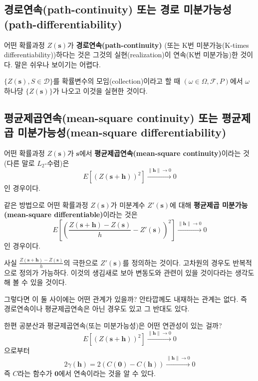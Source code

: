 \documentclass[b5paper,]{scrbook}
\theoremstyle{plain}
\theoremstyle{definition}
\numberwithin{equation}{section}
\begin{document}
\hypertarget{path-continuity---path-differentiability}{%
\subsection{경로연속(path-continuity) 또는 경로 미분가능성(path-differentiability)}\label{path-continuity---path-differentiability}}

어떤 확률과정 \(Z(\mathbf{s})\)가 \textbf{경로연속(path-continuity)} (또는 K번 미분가능(K-times differentiability))하다는 것은 그것의 실현(realization)이 연속(K번 미분가능)한 것이다. 말은 쉬우나 보이기는 어렵다.

\(\{ Z(\mathbf{s}) , S \in \mathcal{D}\}\)를 확률변수의 모임(collection)이라고 할 때 \((\omega \in \Omega, \mathcal{F}, P)\)에서 \(\omega\) 하나당 \(\{ Z(\mathbf{s})\}\)가 나오고 이것을 실현한 것이다.

\hypertarget{mean-square-continuity---mean-square-differentiability}{%
\subsection{평균제곱연속(mean-square continuity) 또는 평균제곱 미분가능성(mean-square differentiability)}\label{mean-square-continuity---mean-square-differentiability}}

어떤 확률과정 \(Z(\mathbf{s})\)가 \(\mathbf{s}\)에서 \textbf{평균제곱연속(mean-square continuity)}이라는 것(다른 말로 \(L_{2}\)-수렴)은
\[E[(Z(\mathbf{s}+\mathbf{h}))^{2}] \stackrel{\|\mathbf{h}\| \rightarrow 0}{\rightarrow} 0\]
인 경우이다.

같은 방법으로 어떤 확률과정 \(Z(\mathbf{s})\)가 미분계수 \(Z'(\mathbf{s})\)에 대해 \textbf{평균제곱 미분가능(mean-square differentiable)}이라는 것은
\[E[(\frac{Z(\mathbf{s}+\mathbf{h})-Z(\mathbf{s})}{h}-Z'(\mathbf{s}))^{2}] \stackrel{\|\mathbf{h}\| \rightarrow 0}{\rightarrow} 0\]
인 경우이다.

사실 \(\frac{Z(\mathbf{s}+\mathbf{h})-Z(\mathbf{s})}{h}\)의 극한으로 \(Z'(\mathbf{s})\)를 정의하는 것이다. 고차원의 경우도 반복적으로 정의가 가능하다. 이것의 생김새로 보아 변동도와 관련이 있을 것이다라는 생각도 해 볼 수 있을 것이다.

그렇다면 이 둘 사이에는 어떤 관계가 있을까? 안타깝께도 내재하는 관계는 없다. 즉 경로연속이나 평균제곱연속은 아닌 경우도 있고 그 반대도 있다.

한편 공분산과 평균제곱연속(또는 미분가능성)은 어떤 연관성이 있는 걸까?
\[E[(Z(\mathbf{s}+\mathbf{h}))^{2}] \stackrel{\|\mathbf{h}\| \rightarrow 0}{\rightarrow} 0\]
으로부터
\[2\gamma(\mathbf{h})=2(C(\mathbf{0})-C(\mathbf{h})) \stackrel{\|\mathbf{h}\| \rightarrow 0}{\rightarrow} 0\]
즉 \(C\)라는 함수가 \(\mathbf{0}\)에서 연속이라는 것을 알 수 있다.
\end{document}
